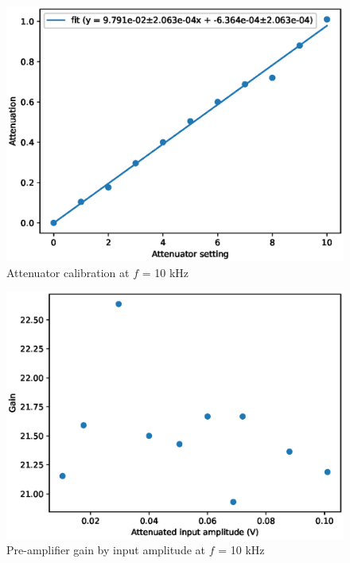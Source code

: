 \documentclass[a4paper]{article}
\begin{document}
\begin{appendices}
\begin{figure}[ht!]
\centering
\includegraphics[width=\textwidth]{fig/python/attenuator}
\caption{Attenuator calibration at $f$ = 10 kHz}
\label{fig:attenuator}
\end{figure}

\begin{figure}[ht!]
\centering
\includegraphics[width=\textwidth]{fig/python/preamp_gain}
\caption{Pre-amplifier gain by input amplitude at $f$ = 10 kHz}
\label{fig:attenuator}
\end{figure}



\end{appendices}
\end{document}
